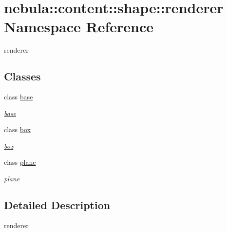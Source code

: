 \hypertarget{namespacenebula_1_1content_1_1shape_1_1renderer}{
\section{nebula::content::shape::renderer Namespace Reference}
\label{namespacenebula_1_1content_1_1shape_1_1renderer}
}


renderer  
\subsection*{Classes}
\begin{DoxyCompactItemize}
\item 
class \hyperlink{classnebula_1_1content_1_1shape_1_1renderer_1_1base}{base}
\begin{DoxyCompactList}\small\item\em \hyperlink{classnebula_1_1content_1_1shape_1_1renderer_1_1base}{base} \item\end{DoxyCompactList}\item 
class \hyperlink{classnebula_1_1content_1_1shape_1_1renderer_1_1box}{box}
\begin{DoxyCompactList}\small\item\em \hyperlink{classnebula_1_1content_1_1shape_1_1renderer_1_1box}{box} \item\end{DoxyCompactList}\item 
class \hyperlink{classnebula_1_1content_1_1shape_1_1renderer_1_1plane}{plane}
\begin{DoxyCompactList}\small\item\em plane \item\end{DoxyCompactList}\end{DoxyCompactItemize}


\subsection{Detailed Description}
renderer 